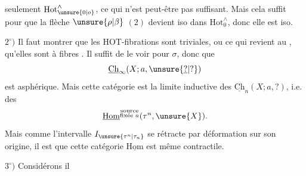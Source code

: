 seulement  $\mathrm{Hot}_{\unsure{0|o}}^{\wedge}$, ce qui n'est peut-être pas suffisant. Mais cela suffit pour  que la flèche $\unsure{\rho|\beta}$  $(2)$ devient iso dans $\mathrm{Hot}_0^{\wedge}$, donc elle est iso.

$2^\circ)$ Il faut montrer que les HOT-fibrations
sont triviales, ou ce qui revient au ,  qu'elles sont à fibres . Il suffit de le voir pour $\sigma$, donc que
\[
\underline{\mathrm{Ch}}_{\infty}(X;a,\unsure{\underline{?}|?})
\]
est asphérique. Mais cette catégorie est la limite inductive des $\underline{\mathrm{Ch}}_n(X;a,?)$, i.e. des
\[
\underline{\mathrm{Hom}}^{\substack{\text{source}\\\text{fixée }a}}(\tau^n,\unsure{X}).
\]
Mais comme l'intervalle $I_{\unsure{\tau^n|\tau_n}}$ se rétracte par déformation sur son origine, il est  que cette catégorie $\underline{\mathrm{Hom}}$ est même contractile.

$3^\circ)$ Considérons
il

